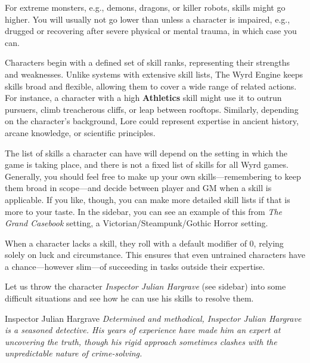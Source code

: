 For extreme monsters, e.g., demons, dragons, or killer robots, skills might go higher. You will usually not go lower than \Untrained unless a character is impaired, e.g., drugged or recovering after severe physical or mental trauma, in which case you can.


Characters begin with a defined set of skill ranks, representing their strengths and weaknesses. Unlike systems with extensive skill lists, The Wyrd Engine keeps skills broad and flexible, allowing them to cover a wide range of related actions. For instance, a character with a high \textbf{Athletics} skill might use it to outrun pursuers, climb treacherous cliffs, or leap between rooftops. Similarly, depending on the character's background, Lore could represent expertise in ancient history, arcane knowledge, or scientific principles.

The list of skills a character can have will depend on the setting in which the game is taking place, and there is not a fixed list of skills for all Wyrd games. Generally, you should feel free to make up your own skills---remembering to keep them broad in scope---and decide between player and GM when a skill is applicable. If you like, though, you can make more detailed skill lists if that is more to your taste. In the sidebar, you can see an example of this from \emph{The Grand Casebook} setting, a Victorian/Steampunk/Gothic Horror setting.

When a character lacks a skill, they roll with a default modifier of 0, relying solely on luck and circumstance. This ensures that even untrained characters have a chance—however slim—of succeeding in tasks outside their expertise.

Let us throw the character \emph{Inspector Julian Hargrave} (see sidebar) into some difficult situations and see how he can use his skills to resolve them.

\begin{WyrdNPC}[float=!t]{Inspector Julian Hargrave}
	\emph{Determined and methodical, Inspector Julian Hargrave is a seasoned detective. His years of experience have made him an expert at uncovering the truth, though his rigid approach sometimes clashes with the unpredictable nature of crime-solving.}

	\vspace{0.5\baselineskip}
	\SkillsBox[%
		expert={Investigate},%
		skilled={Notice, Rapport},%
		novice={Will, Provoke, Athletics},%
		untrained={Stealth, Burglary, Shoot, Resources}%
	]
\end{WyrdNPC}

